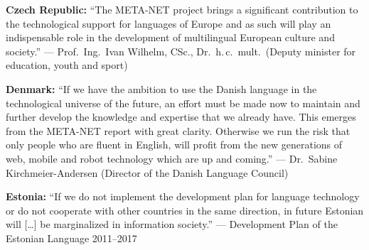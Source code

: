 \documentclass[10pt, plain]{../../metanetpaper}
\begin{document}
\maketitle

\clearpage


\makefundingnotice

\clearpage









\textbf{Czech Republic:} ``The META-NET project brings a significant contribution to the technological support for languages of Europe and as such will play an indispensable role in the development of multilingual European culture and society.'' --- Prof.~Ing.~Ivan Wilhelm, CSc., Dr.~h.\,c.~mult.~(Deputy minister for education, youth and sport)

\bigskip \textbf{Denmark:} ``If we have the ambition to use the Danish language in the technological universe of the future, an effort must be made now to maintain and further develop the knowledge and expertise that we already have. This emerges from the META-NET report with great clarity. Otherwise we run the risk that only people who are fluent in English, will profit from the new generations of web, mobile and robot technology which are up and coming.'' --- Dr.~Sabine Kirchmeier-Andersen (Director of the Danish Language Council)

\bigskip \textbf{Estonia:} ``If we do not implement the development plan for language technology or do not cooperate with other countries in the same direction, in future Estonian will [\dots] be marginalized in information society.'' --- Development Plan of the Estonian Language 2011--2017
\end{document}
